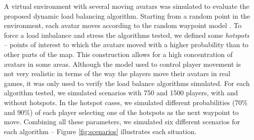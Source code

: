 \documentclass[acmjacm]{acmtrans2m}
\newcommand{\figurecaption}{Figure}
\begin{document}
A virtual environment with several moving avatars was simulated to evaluate the proposed dynamic load balancing algorithm. Starting from a random point in the environment, each avatar moves according to the random waypoint model \cite{bettstetter2004spr}. To force a load imbalance and stress the algorithms tested, we defined some \emph{hotspots} -- points of interest to which the avatars moved with a higher probability than to other parts of the map. This construction allows for a high concentration of avatars in some areas. Although the model used to control player movement is not very realistic in terms of the way the players move their avatars in real games, it was only used to verify the load balance algorithms simulated. For each algorithm tested, we simulated scenarios with 750 and 1500 players, with and without hotspots. In the hotspot cases, we simulated different probabilities (70\% and 90\%) of each player selecting one of the hotspots as the next waypoint to move. Combining all these parameters, we simulated six different scenarios for each algorithm -- \figurecaption{} \ref{fig:scenarios} illustrates each situation.
\end{document}
